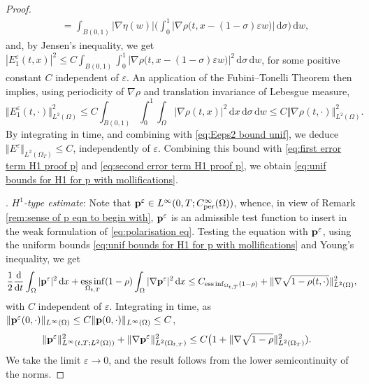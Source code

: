 \documentclass[11pt,a4paper,reqno]{amsart}
\theoremstyle{remark}
\theoremstyle{definition}
\numberwithin{equation}{section}
\newcommand{\per}{\mathrm{per}}
\DeclareMathOperator{\essinf}{ess \, inf}
\newcommand{\p}{{\bf p}}
\renewcommand{\d}{\, \mathrm{d} }
\newcommand{\der}{\mathrm{d}}
\begin{document}
\begin{proof}
\begin{equation*}
\begin{aligned}
        &= \int_{B(0,1)} |\nabla \eta (w)| \bigg(  \int_0^1 |\nabla \rho \big(t, x - (1-\sigma)\varepsilon w \big)| \d \sigma\bigg) \d w, 
    \end{aligned}
\end{equation*}
and, by Jensen's inequality, we get $|E^\varepsilon_1(t,x)|^2 \leq C \int_{B(0,1)} \int_0^1 |\nabla \rho \big(t, x - (1-\sigma)\varepsilon w \big)|^2 \d \sigma \d w$, for some positive constant $C$ independent of $\varepsilon$. An application of the Fubini--Tonelli Theorem then implies, using periodicity of $\nabla \rho$ and translation invariance of Lebesgue measure, 
\begin{equation*}
    \Vert E^\varepsilon_1(t,\cdot) \Vert^2_{L^2(\Omega)} \leq C \int_{B(0,1)} \int_0^1 \int_\Omega |\nabla \rho(t,x)|^2 \d x \d \sigma \d w \leq C \Vert \nabla \rho(t,\cdot) \Vert^2_{L^2(\Omega)}. 
\end{equation*}
By integrating in time, and combining with \eqref{eq:Eeps2 bound unif}, we deduce $\Vert E^\varepsilon \Vert_{L^2(\Omega_T)} \leq C$, independently of $\varepsilon$. Combining this bound with \eqref{eq:first error term H1 proof p} and \eqref{eq:second error term H1 proof p}, we obtain \eqref{eq:unif bounds for H1 for p with mollifications}. 

\smallskip 

    . \textit{$H^1$-type estimate}: Note that $\p^\varepsilon \in L^\infty(0,T;C^\infty_{\per}(\Omega))$, whence, in view of Remark \ref{rem:sense of p eqn to begin with}, $\p^\varepsilon$ is an admissible test function to insert in the weak formulation of \eqref{eq:polarisation eq}. Testing the equation with $\p^\varepsilon$, using the uniform bounds \eqref{eq:unif bounds for H1 for p with mollifications} and Young's inequality, we get 
    \begin{equation*}
        \begin{aligned}
            \frac{1}{2}\frac{\der}{\der t}\int_\Omega |\p^\varepsilon|^2 \d x + \essinf_{\Omega_{t,T}}(1-\rho) \int_\Omega |\nabla \p^\varepsilon|^2 \d x \leq C_{\essinf_{\Omega_{t,T}}(1-\rho)} + \Vert \nabla \sqrt{1-\rho(t,\cdot)} \Vert^2_{L^2(\Omega)} , 
        \end{aligned}
    \end{equation*}
with $C$ independent of $\varepsilon$. Integrating in time, as $\Vert \p^\varepsilon(0,\cdot)\Vert_{L^\infty(\Omega)} \leq C \Vert \p(0,\cdot)\Vert_{L^\infty(\Omega)} \leq C$, 
    \begin{equation}\label{eq:just before H1 final bound for p}
        \begin{aligned}
            \Vert \p^\varepsilon\Vert_{L^\infty(t,T;L^2(\Omega))}^2 + \Vert \nabla \p^\varepsilon\Vert_{L^2(\Omega_{t,T})}^2 &\leq C\big( 1+ \Vert \nabla \sqrt{1-\rho} \Vert^2_{L^2(\Omega_T)}). 
        \end{aligned}
    \end{equation}
    We take the limit $\varepsilon \to 0$, and the result follows from the lower semicontinuity of the norms. 
    

\end{proof}
\end{document}
